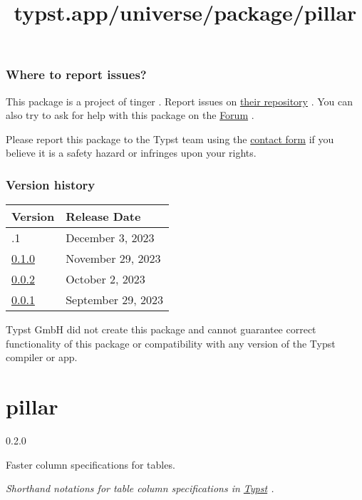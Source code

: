 \subsubsection{Where to report issues?}\label{where-to-report-issues}

This package is a project of tinger . Report issues on
\href{https://github.com/tingerrr/anti-matter}{their repository} . You
can also try to ask for help with this package on the
\href{https://forum.typst.app}{Forum} .

Please report this package to the Typst team using the
\href{https://typst.app/contact}{contact form} if you believe it is a
safety hazard or infringes upon your rights.

\label{versions}
\subsubsection{Version history}\label{version-history}

\begin{longtable}[]{@{}ll@{}}
\toprule\noalign{}
Version & Release Date \\
\midrule\noalign{}
\endhead
\bottomrule\noalign{}
\endlastfoot
0.1.1 & December 3, 2023 \\
\href{https://typst.app/universe/package/anti-matter/0.1.0/}{0.1.0} &
November 29, 2023 \\
\href{https://typst.app/universe/package/anti-matter/0.0.2/}{0.0.2} &
October 2, 2023 \\
\href{https://typst.app/universe/package/anti-matter/0.0.1/}{0.0.1} &
September 29, 2023 \\
\end{longtable}

Typst GmbH did not create this package and cannot guarantee correct
functionality of this package or compatibility with any version of the
Typst compiler or app.


\title{typst.app/universe/package/pillar}

\label{banner}
\section{pillar}\label{pillar}

{ 0.2.0 }

Faster column specifications for tables.

\label{readme}
\emph{Shorthand notations for table column specifications in
\href{https://typst.app/}{Typst} .}

